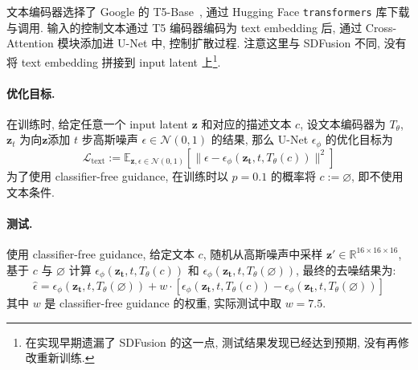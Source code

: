 \documentclass[11pt]{article}
\newcommand\1{\mathds{1}}
\newcommand\R{\mathbb{R}}
\newcommand\E{\mathbb{E}}
\begin{document}
文本编码器选择了 Google 的 T5-Base~\cite{2020t5}, 通过 Hugging Face \texttt{transformers} 库下载与调用. 输入的控制文本通过 T5 编码器编码为 text embedding 后, 
通过 Cross-Attention 模块添加进 U-Net 中, 控制扩散过程. 注意这里与 SDFusion 不同, 没有将 text embedding 拼接到 input latent 上\footnote{在实现早期遗漏了 SDFusion 的这一点, 测试结果发现已经达到预期, 没有再修改重新训练.}.

\paragraph{优化目标.} 在训练时, 给定任意一个 input latent $\mathbf{z}$ 和对应的描述文本 $c$, 设文本编码器为 $T_\theta$, $\mathbf{z}_t$ 为向$\mathbf{z}$添加 $t$ 步高斯噪声 $\epsilon \in \mathcal{N}(0,1)$ 的结果, 那么 U-Net $\epsilon_\phi$ 的优化目标为
\begin{equation}
    \mathcal{L}_{\text{text}} := \E_{\mathbf{z}, \epsilon \in \mathcal{N}(0,1)} \left[\|\epsilon - \epsilon_{\phi}(\mathbf{z_t}, t, T_\theta(c))\|^2\right]
\end{equation}
为了使用 classifier-free guidance, 在训练时以 $p = 0.1$ 的概率将 $c := \varnothing$, 即不使用文本条件.

\paragraph{测试.} 使用 classifier-free guidance, 给定文本 $c$, 随机从高斯噪声中采样 $\mathbf{z'} \in \R^{16\times 16\times 16}$, 基于 $c$ 与 $\varnothing$ 计算 $\epsilon_{\phi}(\mathbf{z_t}, t, T_\theta(c))$ 和 $\epsilon_{\phi}(\mathbf{z_t}, t, T_\theta(\varnothing))$, 
最终的去噪结果为:
\begin{equation}
    \hat{\epsilon} = \epsilon_{\phi}(\mathbf{z_t}, t, T_\theta(\varnothing)) + w \cdot\left[\epsilon_{\phi}(\mathbf{z_t}, t, T_\theta(c)) - \epsilon_{\phi}(\mathbf{z_t}, t, T_\theta(\varnothing))\right]
\end{equation}
其中 $w$ 是 classifier-free guidance 的权重, 实际测试中取 $w = 7.5$.
\end{document}
